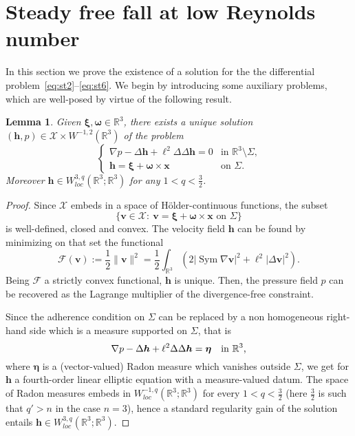 \documentclass[final]{amsart}
\newtheorem{lem}[thm]{Lemma}
\theoremstyle{definition}
\theoremstyle{definition}
\theoremstyle{remark}
\begin{document}
\section{Steady free fall at low Reynolds number}
\label{sec:freefall}

In this section we prove the existence of a solution for the the
differential problem~\eqref{eq:st2}--\eqref{eq:st6}. We begin by
introducing some auxiliary problems, which are well-posed by virtue of
the following result.

\begin{lem}\label{lem:aux}
Given ${\boldsymbol \xi},{\boldsymbol \omega}\in{\mathbb R}^3$, there exists a unique
solution $({\boldsymbol h},p)\in \mathcal{X}\times W^{-1,2}({\mathbb R}^3)$ of the problem
\begin{equation}\label{eq:aux}
\begin{cases}
\nabla p- \Delta {\boldsymbol h} +\ell^2\Delta\Delta {\boldsymbol h}=0 &\text{in
  ${\mathbb R}^3\setminus {\Sigma}$,}\\
{\boldsymbol h}={\boldsymbol \xi}+{\boldsymbol \omega}\times{\boldsymbol x} &\text{on ${\Sigma}$.}
\end{cases}
\end{equation}
Moreover ${\boldsymbol h}\in W^{3,q}_{loc}({\mathbb R}^3;{\mathbb R}^3)$ for any $1<q<\frac 3 2$.
\end{lem}
\begin{proof}
  Since $\mathcal{X}$ embeds in a space of H\"older-continuous functions, the
  subset
\[
\{{\boldsymbol v}\in \mathcal{X}:\ {\boldsymbol v}={\boldsymbol \xi}+{\boldsymbol \omega}\times{\boldsymbol x}\text{ on }{\Sigma}\}
\]
is well-defined, closed and convex. The velocity field ${\boldsymbol h}$ can be
found by minimizing on that set the functional
\[
\mathcal F({\boldsymbol v}):=\frac{1}{2}\|{\boldsymbol v}\|^2=\frac 1 2 \int_{{\mathbb R}^3}\left(2|{\operatorname{\mathrm{Sym}}}\nabla{\boldsymbol v}|^2+\ell^2|{\Delta}{\boldsymbol v}|^2\right).
\]
Being $\mathcal F$ a strictly convex functional, ${\boldsymbol h}$ is
unique. Then, the pressure field $p$ can be recovered as the Lagrange
multiplier of the divergence-free constraint.

Since the adherence condition on ${\Sigma}$ can be replaced by a non
homogeneous right-hand side which is a measure supported on ${\Sigma}$,
that is
\[
\nabla p- \Delta {\boldsymbol h} +\ell^2\Delta\Delta {\boldsymbol h}={\boldsymbol \eta} \quad\text{in ${\mathbb R}^3$,}\\
\]
where ${\boldsymbol \eta}$ is a (vector-valued) Radon measure which vanishes
outside ${\Sigma}$, we get for ${\boldsymbol h}$ a fourth-order linear elliptic
equation with a measure-valued datum. The space of
Radon measures embeds in $W^{-1,q}_{loc}({\mathbb R}^3;{\mathbb R}^3)$ for
every $1<q<\frac 3 2$ (here $\frac 3 2$ is such that $q'>n$ in the
case $n=3$), hence a standard regularity gain of the solution
\cite[Theorem $15.3'$]{AgmDou59} entails ${\boldsymbol h}\in
W^{3,q}_{loc}({\mathbb R}^3;{\mathbb R}^3)$.
\end{proof}
\end{document}
